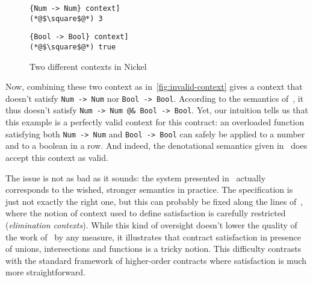 \documentclass[sigplan,10pt,review,anonymous]{acmart}
\newcommand{\nickel}[1]{\lstinline[language=nickel]{#1}}
\begin{document}
\begin{figure}[h]
\begin{lstlisting}[language=nickel, title=\nickel{Num -> Num} context]
(*@$\square$@*) 3
\end{lstlisting}
\begin{lstlisting}[language=nickel, title=\nickel{Bool -> Bool} context]
(*@$\square$@*) true
\end{lstlisting}
\caption{Two different contexts in Nickel}
\label{fig:valid-contexts}
\end{figure}

Now, combining these two context as in~\ref{fig:invalid-context} gives a context
that doesn't satisfy \nickel{Num -> Num} nor \nickel{Bool -> Bool}.  According
to the semantics of~\cite{RootCauseOfBlame}, it thus doesn't satisfy \nickel{Num
-> Num @& Bool -> Bool}. Yet, our intuition tells us that this example is a
perfectly valid context for this contract: an overloaded function satisfying
both \nickel{Num -> Num} and \nickel{Bool -> Bool} can safely be applied to a
number and to a boolean in a row. And indeed, the denotational semantics given
in~\cite{KeilThiemannUnionIntersection} does accept this context as valid.

The issue is not as bad as it sounds: the system presented
in~\cite{RootCauseOfBlame} actually corresponds to the wished, stronger
semantics in practice. The specification is just not exactly the right one, but
this can probably be fixed along the lines
of~\cite{KeilThiemannUnionIntersection}, where the notion of context used to
define satisfaction is carefully restricted (\emph{elimination contexts}). While
this kind of oversight doesn't lower the quality of the work
of~\cite{RootCauseOfBlame} by any measure, it illustrates that contract
satisfaction in presence of unions, intersections and functions is a tricky
notion. This difficulty contrasts with the standard framework of higher-order
contracts where satisfaction is much more straightforward.
\end{document}
